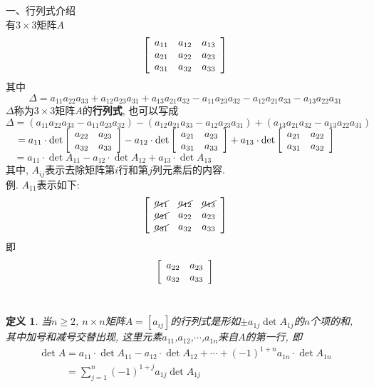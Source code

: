 \documentclass[UTF8, fontset=ubuntu]{ctexart}
\theoremstyle{nonumberplain}
\newtheorem{definition}{定义}
\theoremstyle{plain}
\begin{document}
一、行列式介绍\\[1ex]
有$3\times 3$矩阵$A$
\[\left[\begin{array}{l l l}
a_{11} & a_{12} & a_{13}\\
a_{21} & a_{22} & a_{23}\\
a_{31} & a_{32} & a_{33}
\end{array}\right]\]
其中
\[\Delta=a_{11}a_{22}a_{33}+a_{12}a_{23}a_{31}+a_{13}a_{21}a_{32}-a_{11}a_{23}a_{32}-a_{12}a_{21}a_{33}-a_{13}a_{22}a_{31}\]
$\Delta$称为$3\times 3$矩阵$A$的\textbf{行列式}, 也可以写成\\
$\Delta=(a_{11}a_{22}a_{33}-a_{11}a_{23}a_{32})-(a_{12}a_{21}a_{33}-a_{12}a_{23}a_{31})+(a_{13}a_{21}a_{32}-a_{13}a_{22}a_{31})$\\[1ex]
$\phantom{\Delta}=a_{11}\cdot\det\left[\begin{array}{l l}
a_{22} & a_{23}\\
a_{32} & a_{33}
\end{array}\right]-a_{12}\cdot\det\left[\begin{array}{l l}
a_{21} & a_{23}\\
a_{31} & a_{33}
\end{array}\right]+a_{13}\cdot\det\left[\begin{array}{l l}
a_{21} & a_{22}\\
a_{31} & a_{32}
\end{array}\right]$\\[1ex]
$\phantom{\Delta}=a_{11}\cdot\det A_{11}-a_{12}\cdot\det A_{12}+a_{13}\cdot\det A_{13}$\\
其中, $A_{ij}$表示去除矩阵第$i$行和第$j$列元素后的内容.\\
例. $A_{11}$表示如下:\\
\[\left[\begin{array}{l l l}
\cancel{a_{11}} & \cancel{a_{12}} & \cancel{a_{13}}\\
\cancel{a_{21}} & a_{22} & a_{23}\\
\cancel{a_{31}} & a_{32} & a_{33}
\end{array}\right]\]
即
\[\left[\begin{array}{l l}
a_{22} & a_{23}\\
a_{32} & a_{33}
\end{array}\right]\]\\[2ex]

\begin{definition}
当$n\geqslant 2$, $n\times n$矩阵$A=[a_{ij}]$的行列式是形如$\pm a_{1j}\det A_{1j}$的$n$个项的和, 其中加号和减号交替出现, 这里元素$a_{11}$,$a_{12}$,$\cdots$,$a_{1n}$来自$A$的第一行, 即
\[\begin{array}{l}
\det A=a_{11}\cdot\det A_{11}-a_{12}\cdot\det A_{12}+\cdots+(-1)^{1+n}a_{1n}\cdot\det A_{1n}\\
\phantom{\det A}=\displaystyle\sum_{j=1}^n(-1)^{1+j}a_{1j}\det A_{1j}
\end{array}\]
\end{definition}\vspace{4ex}
\end{document}
